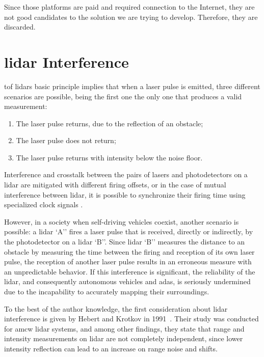 Since those platforms are paid and required connection to the Internet, they are not good candidates to the solution we are trying to develop. Therefore, they are discarded.


\section{\ac{lidar} Interference}
\label{sec:sota:lidar-interference}
\ac{tof} \ac{lidar}s basic principle implies that when a \ac{laser} pulse is emitted, three different scenarios are possible, being the first one the only one that produces a valid measurement:

\begin{enumerate}
\item The \ac{laser} pulse returns, due to the reflection of an obstacle;
\item The \ac{laser} pulse does not return;
\item The \ac{laser} pulse returns with intensity below the noise floor.
\end{enumerate}

Interference and crosstalk between the pairs of \acp{laser} and photodetectors on a \ac{lidar} are mitigated with different firing offsets, or in the case of mutual interference between \ac{lidar}, it is possible to synchronize their firing time using specialized clock signals \cite{vlp16}.

However, in a society when self-driving vehicles coexist, another scenario is possible: a \ac{lidar} `A'' fires a \ac{laser} pulse that is received, directly or indirectly, by the photodetector on a \ac{lidar} `B''. Since \ac{lidar} `B'' measures the distance to an obstacle by measuring the time between the firing and reception of its own \ac{laser} pulse, the reception of another \ac{laser} pulse results in an erroneous measure with an unpredictable behavior. If this interference is significant, the reliability of the \ac{lidar}, and consequently autonomous vehicles and \ac{adas}, is seriously undermined due to the incapability to accurately mapping their surroundings.



To the best of the author knowledge, the first consideration about \ac{lidar} interference is given by Hebert and Krotkov in 1991~\cite{Hebert}. Their study was conducted for \ac{amcw} \ac{lidar} systems, and among other findings, they state that range and intensity measurements on \ac{lidar} are not completely independent, since lower intensity reflection can lead to an increase on range noise and shifts. 

